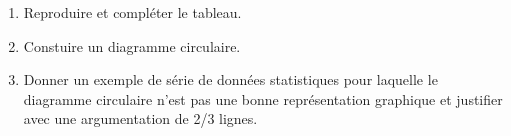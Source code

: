 \documentclass[12pt]{article}
\begin{document}
\begin{enumerate}
\item Reproduire et compléter le tableau.
\item Constuire un diagramme circulaire.
\item Donner un exemple de série de données statistiques pour laquelle le diagramme circulaire n'est pas une bonne représentation graphique et justifier avec une argumentation de 2/3 lignes.
\end{enumerate}
\end{document}
